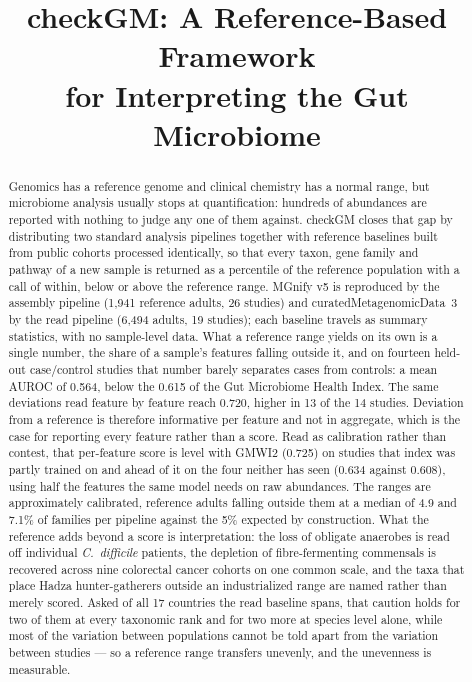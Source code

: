 \documentclass[conference]{IEEEtran}
\newcommand{\cdiff}{\textit{C.~difficile}}
\begin{document}
\title{checkGM: A Reference-Based Framework\\for Interpreting the Gut Microbiome}
\author{}
\maketitle

\begin{abstract}
Genomics has a reference genome and clinical chemistry has a normal range, but microbiome analysis usually stops at quantification: hundreds of abundances are reported with nothing to judge any one of them against. checkGM closes that gap by distributing two standard analysis pipelines together with reference baselines built from public cohorts processed identically, so that every taxon, gene family and pathway of a new sample is returned as a percentile of the reference population with a call of within, below or above the reference range. MGnify v5 is reproduced by the assembly pipeline (1{,}941 reference adults, 26 studies) and curatedMetagenomicData~3 by the read pipeline (6{,}494 adults, 19 studies); each baseline travels as summary statistics, with no sample-level data. What a reference range yields on its own is a single number, the share of a sample's features falling outside it, and on fourteen held-out case/control studies that number barely separates cases from controls: a mean AUROC of 0.564, below the 0.615 of the Gut Microbiome Health Index. The same deviations read feature by feature reach 0.720, higher in 13 of the 14 studies. Deviation from a reference is therefore informative per feature and not in aggregate, which is the case for reporting every feature rather than a score. Read as calibration rather than contest, that per-feature score is level with GMWI2 (0.725) on studies that index was partly trained on and ahead of it on the four neither has seen (0.634 against 0.608), using half the features the same model needs on raw abundances. The ranges are approximately calibrated, reference adults falling outside them at a median of 4.9 and 7.1\% of families per pipeline against the 5\% expected by construction. What the reference adds beyond a score is interpretation: the loss of obligate anaerobes is read off individual \cdiff{} patients, the depletion of fibre-fermenting commensals is recovered across nine colorectal cancer cohorts on one common scale, and the taxa that place Hadza hunter-gatherers outside an industrialized range are named rather than merely scored. Asked of all 17 countries the read baseline spans, that caution holds for two of them at every taxonomic rank and for two more at species level alone, while most of the variation between populations cannot be told apart from the variation between studies --- so a reference range transfers unevenly, and the unevenness is measurable.
\end{abstract}
\end{document}
